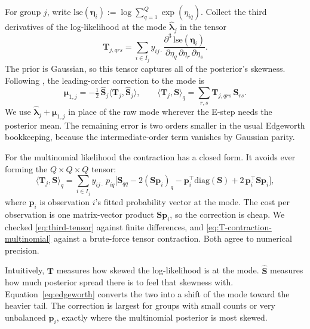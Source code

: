 For group $j$, write $\mathrm{lse}(\bm{\eta}_i) := \log\sum_{q=1}^Q \exp(\eta_{iq})$. Collect the third derivatives of the log-likelihood at the mode $\hat{\bm\lambda}_j$ in the tensor
\begin{equation}
    \mathbf{T}_{j,qrs} = \sum_{i \in I_j} y_{ij\cdot} \frac{\partial^3\,\mathrm{lse}(\bm{\eta}_i)}{\partial\eta_q\,\partial\eta_r\,\partial\eta_s}.
    \label{eq:third-tensor}
\end{equation}
The prior is Gaussian, so this tensor captures all of the posterior's skewness. Following \citet{katsevich2024}, the leading-order correction to the mode is
\begin{equation}
    \bm{\mu}_{1,j} = -\tfrac{1}{2}\,\hat{\mathbf{S}}_j\big\langle \mathbf{T}_j, \hat{\mathbf{S}}_j \big\rangle, \qquad \big\langle \mathbf{T}_j, \mathbf{S}\big\rangle_q = \sum_{r,s} \mathbf{T}_{j,qrs}\,\mathbf{S}_{rs}.
    \label{eq:edgeworth}
\end{equation}
We use $\hat{\bm\lambda}_j + \bm\mu_{1,j}$ in place of the raw mode wherever the E-step needs the posterior mean. The remaining error is two orders smaller in the usual Edgeworth bookkeeping, because the intermediate-order term vanishes by Gaussian parity.

For the multinomial likelihood the contraction has a closed form. It avoids ever forming the $Q\times Q\times Q$ tensor:
\begin{equation}
    \big\langle \mathbf{T}_j, \mathbf{S}\big\rangle_q = \sum_{i \in I_j} y_{ij\cdot}\, p_{iq}\Big[\mathbf{S}_{qq} - 2(\mathbf{S}\bm{p}_i)_q - \bm{p}_i^\top\mathrm{diag}(\mathbf{S}) + 2\,\bm{p}_i^\top\mathbf{S}\bm{p}_i\Big],
    \label{eq:T-contraction-multinomial}
\end{equation}
where $\bm p_i$ is observation $i$'s fitted probability vector at the mode. The cost per observation is one matrix-vector product $\mathbf{S}\bm p_i$, so the correction is cheap. We checked \eqref{eq:third-tensor} against finite differences, and \eqref{eq:T-contraction-multinomial} against a brute-force tensor contraction. Both agree to numerical precision.

Intuitively, $\mathbf{T}$ measures how skewed the log-likelihood is at the mode. $\hat{\mathbf S}$ measures how much posterior spread there is to feel that skewness with. Equation~\eqref{eq:edgeworth} converts the two into a shift of the mode toward the heavier tail. The correction is largest for groups with small counts or very unbalanced $\bm p_i$, exactly where the multinomial posterior is most skewed.

